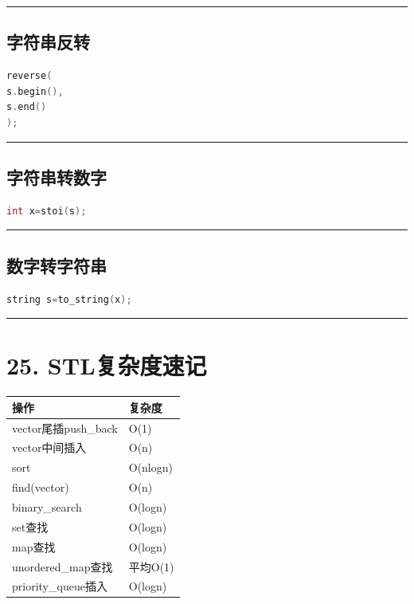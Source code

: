 \documentclass[9pt,twocolumn]{extarticle}
\begin{document}
\noindent\rule{\linewidth}{0.4pt}

\subsection{字符串反转}
\begin{lstlisting}[language=C++]
reverse(
s.begin(),
s.end()
);
\end{lstlisting}

\noindent\rule{\linewidth}{0.4pt}

\subsection{字符串转数字}
\begin{lstlisting}[language=C++]
int x=stoi(s);
\end{lstlisting}

\noindent\rule{\linewidth}{0.4pt}

\subsection{数字转字符串}
\begin{lstlisting}[language=C++]
string s=to_string(x);
\end{lstlisting}

\noindent\rule{\linewidth}{0.4pt}

\section{25. STL复杂度速记}

\begin{table}[h]
\centering
\begin{tabular}{|l|l|}
\hline
操作 & 复杂度 \\ \hline
vector尾插push\_back & O(1) \\ \hline
vector中间插入 & O(n) \\ \hline
sort & O(nlogn) \\ \hline
find(vector) & O(n) \\ \hline
binary\_search & O(logn) \\ \hline
set查找 & O(logn) \\ \hline
map查找 & O(logn) \\ \hline
unordered\_map查找 & 平均O(1) \\ \hline
priority\_queue插入 & O(logn) \\ \hline
\end{tabular}
\end{table}
\end{document}
